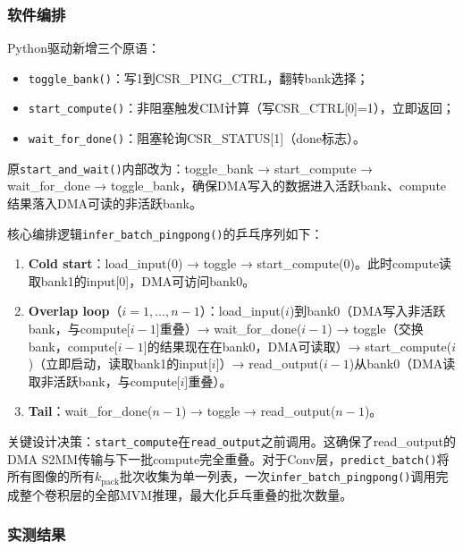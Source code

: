 \documentclass[12pt, a4paper]{article}
\begin{document}
\subsubsection{软件编排}

Python驱动新增三个原语：

\begin{itemize}
    \item \texttt{toggle\_bank()}：写1到CSR\_PING\_CTRL，翻转bank选择；
    \item \texttt{start\_compute()}：非阻塞触发CIM计算（写CSR\_CTRL[0]=1），立即返回；
    \item \texttt{wait\_for\_done()}：阻塞轮询CSR\_STATUS[1]（done标志）。
\end{itemize}

原\texttt{start\_and\_wait()}内部改为：toggle\_bank → start\_compute → wait\_for\_done → toggle\_bank，确保DMA写入的数据进入活跃bank、compute结果落入DMA可读的非活跃bank。

核心编排逻辑\texttt{infer\_batch\_pingpong()}的乒乓序列如下：

\begin{enumerate}
    \item \textbf{Cold start}：load\_input(0) → toggle → start\_compute(0)。此时compute读取bank1的input[0]，DMA可访问bank0。
    \item \textbf{Overlap loop}（$i=1,\ldots,n-1$）：load\_input($i$)到bank0（DMA写入非活跃bank，与compute[$i-1$]重叠）→ wait\_for\_done($i-1$) → toggle（交换bank，compute[$i-1$]的结果现在在bank0，DMA可读取）→ start\_compute($i$)（立即启动，读取bank1的input[$i$]）→ read\_output($i-1$)从bank0（DMA读取非活跃bank，与compute[$i$]重叠）。
    \item \textbf{Tail}：wait\_for\_done($n-1$) → toggle → read\_output($n-1$)。
\end{enumerate}

关键设计决策：\texttt{start\_compute}在\texttt{read\_output}之前调用。这确保了read\_output的DMA S2MM传输与下一批compute完全重叠。对于Conv层，\texttt{predict\_batch()}将所有图像的所有$k_{\text{pack}}$批次收集为单一列表，一次\texttt{infer\_batch\_pingpong()}调用完成整个卷积层的全部MVM推理，最大化乒乓重叠的批次数量。

\subsubsection{实测结果}
\end{document}
